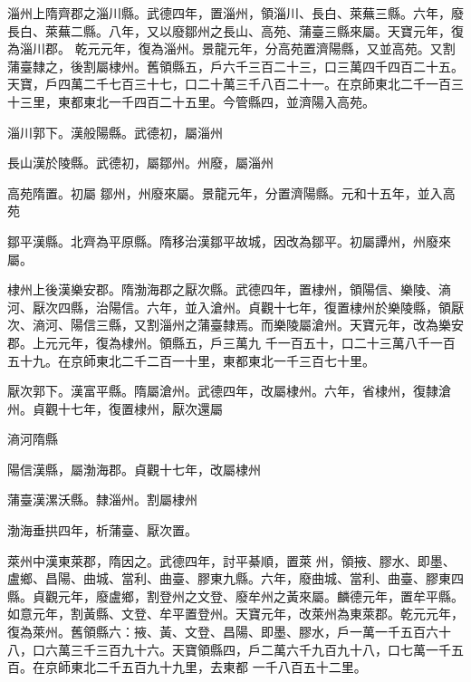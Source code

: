 \begin{pinyinscope}
 淄州上隋齊郡之淄川縣。武德四年，置淄州，領淄川、長白、萊蕪三縣。六年，廢長白、萊蕪二縣。八年，又以廢鄒州之長山、高苑、蒲臺三縣來屬。天寶元年，復為淄川郡。
 乾元元年，復為淄州。景龍元年，分高苑置濟陽縣，又並高苑。又割蒲臺隸之，後割屬棣州。舊領縣五，戶六千三百二十三，口三萬四千四百二十五。天寶，戶四萬二千七百三十七，口二十萬三千八百二十一。在京師東北二千一百三十三里，東都東北一千四百二十五里。今管縣四，並濟陽入高苑。



 淄川郭下。漢般陽縣。武德初，屬淄州



 長山漢於陵縣。武德初，屬鄒州。州廢，屬淄州



 高苑隋置。初屬
 鄒州，州廢來屬。景龍元年，分置濟陽縣。元和十五年，並入高苑



 鄒平漢縣。北齊為平原縣。隋移治漢鄒平故城，因改為鄒平。初屬譚州，州廢來屬。



 棣州上後漢樂安郡。隋渤海郡之厭次縣。武德四年，置棣州，領陽信、樂陵、滳河、厭次四縣，治陽信。六年，並入滄州。貞觀十七年，復置棣州於樂陵縣，領厭次、滳河、陽信三縣，又割淄州之蒲臺隸焉。而樂陵屬滄州。天寶元年，改為樂安郡。上元元年，復為棣州。領縣五，戶三萬九
 千一百五十，口二十三萬八千一百五十九。在京師東北二千二百一十里，東都東北一千三百七十里。



 厭次郭下。漢富平縣。隋屬滄州。武德四年，改屬棣州。六年，省棣州，復隸滄州。貞觀十七年，復置棣州，厭次還屬



 滳河隋縣



 陽信漢縣，屬渤海郡。貞觀十七年，改屬棣州



 蒲臺漢漯沃縣。隸淄州。割屬棣州



 渤海垂拱四年，析蒲臺、厭次置。



 萊州中漢東萊郡，隋因之。武德四年，討平綦順，置萊
 州，領掖、膠水、即墨、盧鄉、昌陽、曲城、當利、曲臺、膠東九縣。六年，廢曲城、當利、曲臺、膠東四縣。貞觀元年，廢盧鄉，割登州之文登、廢牟州之黃來屬。麟德元年，置牟平縣。如意元年，割黃縣、文登、牟平置登州。天寶元年，改萊州為東萊郡。乾元元年，復為萊州。舊領縣六：掖、黃、文登、昌陽、即墨、膠水，戶一萬一千五百六十八，口六萬三千三百九十六。天寶領縣四，戶二萬六千九百九十八，口七萬一千五百。在京師東北二千五百九十九里，去東都
 一千八百五十二里。




\end{pinyinscope}

